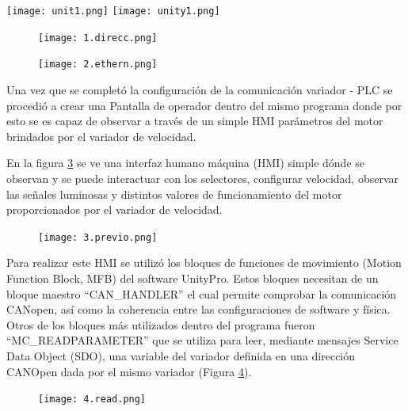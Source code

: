 \begin{center}
	\texttt{[image: unit1.png]}
	\label{fig:uni1}
	\texttt{[image: unity1.png]}
	\label{fig:uni0}
\end{center}

\begin{figure}[h]
	\centering
	\texttt{[image: 1.direcc.png]}
	\label{fig:direcc}
\end{figure}


\begin{figure}[h]
	\centering
	\texttt{[image: 2.ethern.png]}
	\label{fig:inter}
\end{figure}

Una vez que se completó la configuración de la comunicación variador - PLC se procedió a crear una Pantalla de operador dentro del mismo programa donde por esto se es capaz de observar a través de un simple HMI parámetros del motor brindados por el variador de velocidad.

 En la figura \ref{fig:previo} se ve una interfaz humano máquina (HMI) simple dónde se observan y se puede interactuar con los selectores, configurar velocidad, observar las señales luminosas y distintos valores de funcionamiento del motor proporcionados por el variador de velocidad. 
\begin{figure}[H]
	\centering
	\texttt{[image: 3.previo.png]}
	\label{fig:previo}
\end{figure}

Para realizar este HMI se utilizó los bloques de funciones de movimiento (Motion Function Block, MFB) del software UnityPro. Estos bloques necesitan de un bloque maestro ``CAN\_HANDLER'' el cual permite comprobar la comunicación CANopen, así como la coherencia
entre las configuraciones de software y física.
\\
Otros de los bloques más utilizados dentro del programa fueron ``MC\_READPARAMETER'' que se utiliza para leer, mediante mensajes Service Data Object
(SDO), una variable del variador definida en una dirección CANOpen dada por el mismo variador \cite{ComManual} (Figura \ref{fig:read}).

\begin{figure}[H]
	\centering
	\texttt{[image: 4.read.png]}
	\label{fig:read}
\end{figure}

\newpage

